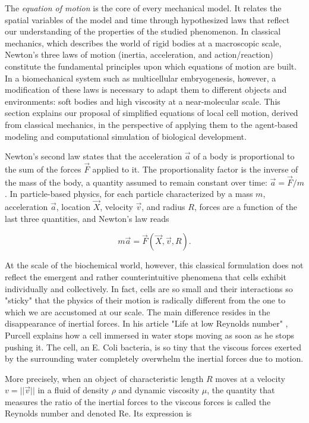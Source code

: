 The \textit{equation of motion} is the core of every mechanical model. It relates the spatial variables of the model and time through hypothesized laws that reflect our understanding of the properties of the studied phenomenon. In classical mechanics, which describes the world of rigid bodies at a macroscopic scale, Newton's three laws of motion (inertia, acceleration, and action/reaction) constitute the fundamental principles upon which equations of motion are built. In a biomechanical system such as multicellular embryogenesis, however, a modification of these laws is necessary to adapt them to different objects and environments: soft bodies and high viscosity at a near-molecular scale. This section explains our proposal of simplified equations of local cell motion, derived from classical mechanics, in the perspective of applying them to the agent-based modeling and computational simulation of biological development.

Newton's second law states that the acceleration $\vec{a}$ of a body is proportional to the sum of the forces $\vec{F}$ applied to it. The proportionality factor is the inverse of the mass of the body, a quantity assumed to remain constant over time: $\vec{a} = \vec{F}/m$. In particle-based physics, for each particle characterized by a mass $m$, acceleration $\vec{a}$, location $\vec{X}$, velocity $\vec{v}$, and radius $R$, forces are a function of the last three quantities, and Newton's law reads

$$ m \vec{a} = \vec{F}(\vec{X}, \vec{v}, R). $$

At the scale of the biochemical world, however, this classical formulation does not reflect the emergent and rather counterintuitive phenomena that cells exhibit individually and collectively. In fact, cells are so small and their interactions so "sticky" that the physics of their motion is radically different from the one to which we are accustomed at our scale. The main difference resides in the disappearance of inertial forces. In his article "Life at low Reynolds number" \cite{Purcell:1977tk}, Purcell explains how a cell immersed in water stops moving as soon as he stops pushing it. The cell, an E. Coli bacteria, is so tiny that the viscous forces exerted by the surrounding water completely overwhelm the inertial forces due to motion.

More precisely, when an object of characteristic length $R$ moves at a velocity $v = ||\vec{v}||$ in a fluid of density $\rho$ and dynamic viscosity $\mu$, the quantity that measures the ratio of the inertial forces to the viscous forces is called the Reynolds number and denoted $\mathrm{Re}$. Its expression is

